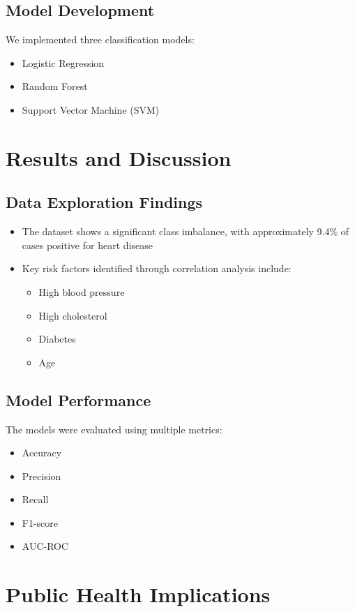 \documentclass[conference]{IEEEtran}
\begin{document}
\subsection{Model Development}
We implemented three classification models:
\begin{itemize}
    \item Logistic Regression
    \item Random Forest
    \item Support Vector Machine (SVM)
\end{itemize}

\section{Results and Discussion}
\subsection{Data Exploration Findings}
\begin{itemize}
    \item The dataset shows a significant class imbalance, with approximately 9.4\% of cases positive for heart disease
    \item Key risk factors identified through correlation analysis include:
    \begin{itemize}
        \item High blood pressure
        \item High cholesterol
        \item Diabetes
        \item Age
    \end{itemize}
\end{itemize}

\subsection{Model Performance}
The models were evaluated using multiple metrics:
\begin{itemize}
    \item Accuracy
    \item Precision
    \item Recall
    \item F1-score
    \item AUC-ROC
\end{itemize}

\section{Public Health Implications}
\end{document}
